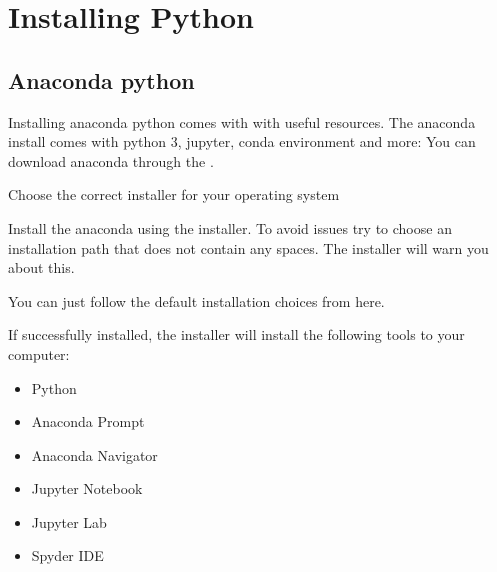 \documentclass[letterpaper,10pt,english]{jupyterBook}
\begin{document}
\sphinxstepscope


\chapter{Installing Python}
\label{\detokenize{installing-python:installing-python}}\label{\detokenize{installing-python::doc}}

\section{Anaconda python}
\label{\detokenize{installing-python:anaconda-python}}
\sphinxAtStartPar
Installing anaconda python comes with with useful resources. The anaconda install comes with python 3, jupyter, conda environment and more:
You can download anaconda through the .

\sphinxAtStartPar
Choose the correct installer for your operating system

\sphinxAtStartPar
{}

\sphinxAtStartPar
Install the anaconda using the installer. To avoid issues try to choose an installation path that does not contain any spaces. The installer will warn you about this.

\sphinxAtStartPar
You can just follow the default installation choices from here.

\sphinxAtStartPar
{}

\sphinxAtStartPar
If successfully installed, the installer will install the following tools to your computer:
\begin{itemize}
\item {} 
\sphinxAtStartPar
Python

\item {} 
\sphinxAtStartPar
Anaconda Prompt

\item {} 
\sphinxAtStartPar
Anaconda Navigator

\item {} 
\sphinxAtStartPar
Jupyter Notebook

\item {} 
\sphinxAtStartPar
Jupyter Lab

\item {} 
\sphinxAtStartPar
Spyder IDE

\end{itemize}
\end{document}
